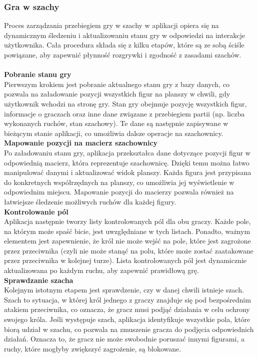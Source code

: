 \documentclass[12pt,a4paper]{article}
\begin{document}
\newpage
\subsubsection{Gra w szachy}
Proces zarządzania przebiegiem gry w szachy w aplikacji opiera się na dynamicznym śledzeniu i aktualizowaniu stanu gry w odpowiedzi na interakcje użytkownika. Cała procedura składa się z kilku etapów, które są ze sobą ściśle powiązane, aby zapewnić płynność rozgrywki i zgodność z zasadami szachów.
\\\\

\textbf{Pobranie stanu gry}\\
Pierwszym krokiem jest pobranie aktualnego stanu gry z bazy danych, co pozwala na załadowanie pozycji wszystkich figur na planszy w chwili, gdy użytkownik wchodzi na stronę gry. Stan gry obejmuje pozycję wszystkich figur, informacje o graczach oraz inne dane związane z przebiegiem partii (np. liczba wykonanych ruchów, stan szachowy). Te dane są następnie zapisywane w bieżącym stanie aplikacji, co umożliwia dalsze operacje na szachownicy.
\\
\textbf{Mapowanie pozycji na macierz szachownicy}\\
Po załadowaniu stanu gry, aplikacja przekształca dane dotyczące pozycji figur w odpowiednią macierz, która reprezentuje szachownicę. Dzięki temu można łatwo manipulować danymi i aktualizować widok planszy. Każda figura jest przypisana do konkretnych współrzędnych na planszy, co umożliwia jej wyświetlenie w odpowiednim miejscu. Mapowanie pozycji do macierzy pozwala również na łatwiejsze śledzenie możliwych ruchów dla każdej figury.
\\

\textbf{Kontrolowanie pól}\\
Aplikacja następnie tworzy listy kontrolowanych pól dla obu graczy. Każde pole, na którym może spaść bicie, jest uwzględniane w tych listach. Ponadto, ważnym elementem jest zapewnienie, że król nie może wejść na pole, które jest zagrożone przez przeciwnika (czyli nie może stanąć na polu, które może zostać zaatakowane przez przeciwnika w kolejnej turze). Lista kontrolowanych pól jest dynamicznie aktualizowana po każdym ruchu, aby zapewnić prawidłową grę.
\\

\textbf{Sprawdzanie szacha}\\
Kolejnym istotnym etapem jest sprawdzenie, czy w danej chwili istnieje szach. Szach to sytuacja, w której król jednego z graczy znajduje się pod bezpośrednim atakiem przeciwnika, co oznacza, że gracz musi podjąć działania w celu ochrony swojego króla. Jeśli występuje szach, aplikacja identyfikuje wszystkie pola, które biorą udział w szachu, co pozwala na zmuszenie gracza do podjęcia odpowiednich działań. Oznacza to, że gracz nie może swobodnie poruszać innymi figurami, a ruchy, które mogłyby zwiększyć zagrożenie, są blokowane.
\\
\end{document}
